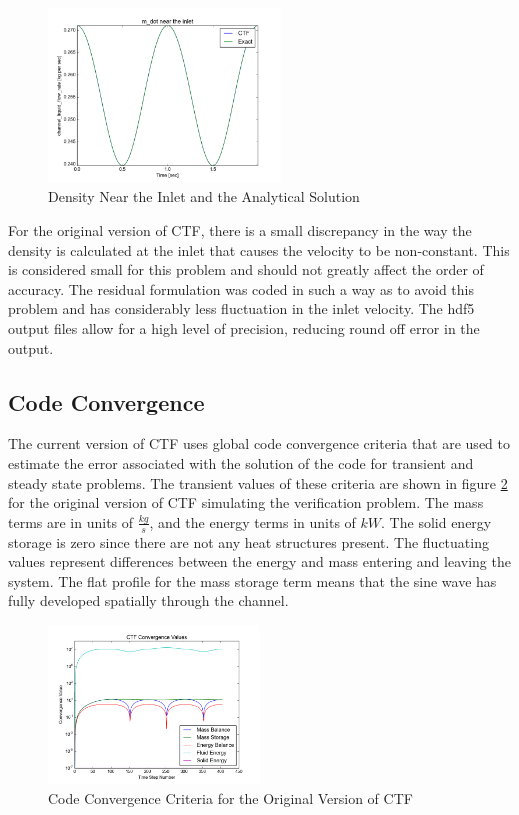 \documentclass{mc2015}
\begin{document}
\begin{figure}[!h]
	\centering
	\includegraphics[width=0.55\textwidth]{images/Code_Verification/run_00_00/residual/results/Inlet_m_dot}
	\caption{Density Near the Inlet and the Analytical Solution}
	\label{fig:Inlet_m_dot}
\end{figure}

 For the original version of CTF, there is a small discrepancy in the way the
 density is calculated at the inlet that causes the velocity to be non-constant.
 This is considered small for this problem and should not greatly affect the
 order of accuracy. The residual formulation was coded in such a way as to avoid
 this problem and has considerably less fluctuation in the inlet velocity. The
 hdf5 output files allow for a high level of precision, reducing
 round off error in the output. 

\subsection{Code Convergence}

The current version of CTF uses global code convergence criteria that are
used to estimate the error associated with the solution of the code for
transient and steady state problems. The transient values of these criteria are
shown in figure \ref{fig:Code_Convergence:Original} for the original version of
CTF simulating the verification problem. The mass terms are in units of
$\frac{kg}{s}$, and the energy terms in units of $kW$. The solid energy storage
is zero since there are not any heat structures present. The fluctuating values
represent differences between the energy and mass entering and leaving the
system. The flat profile for the mass storage term means that the sine wave has
fully developed spatially through the channel. 

\begin{figure}[!h]
	\centering
	\includegraphics[width=0.50\textwidth]{images/Code_Verification/run_00_00/original/results/Convergence_Plot}
	\caption{Code Convergence Criteria for the Original Version of CTF}
	\label{fig:Code_Convergence:Original}
\end{figure}
\end{document}
